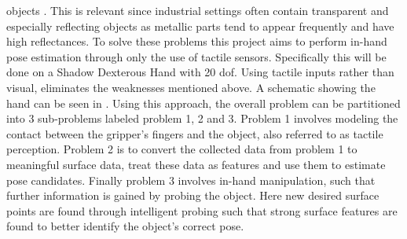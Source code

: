 \begin{minipage}{0.45\textwidth}
	objects \cite{6d-pose-estimation-of-objects:-recent-technologies-and-challenges}. This is relevant since industrial settings often contain transparent and especially reflecting objects as metallic parts tend to appear frequently and have high reflectances. To solve these problems this project aims to perform in-hand pose estimation through only the use of tactile sensors. Specifically this will be done on a Shadow Dexterous Hand \cite{shadow-dex-hand} with 20 \gls{dof}. Using tactile inputs rather than visual, eliminates the weaknesses mentioned above. A schematic showing the hand can be seen in . Using this approach, the overall problem can be partitioned into 3 sub-problems labeled problem 1, 2 and 3. Problem 1 involves modeling the contact between the gripper's fingers and the object, also referred to as tactile perception. Problem 2 is to convert the collected data from problem 1 to meaningful surface data, treat these data as features and use them to estimate pose candidates. Finally problem 3 involves in-hand manipulation, such that further information is gained by probing the object. Here new desired surface points are found through intelligent probing such that strong surface features are found to better identify the object's correct pose. \medskip
	\end{minipage} 
	\hfill
